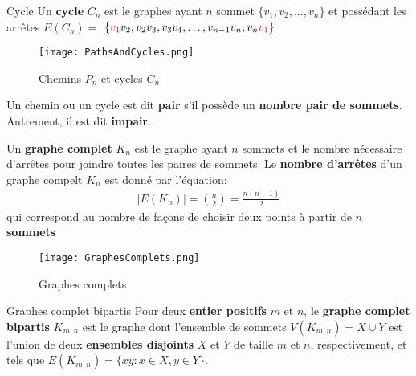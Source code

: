 \documentclass[16pt]{report}
\begin{document}
\begin{multicols*}{2}
            \begin{Definitionx}{Cycle}{}
                Un \textbf{cycle} $C_n$ est le graphes ayant $n$ sommet $\{v_1, v_2, \dots, v_n\}$ et possédant 
                les arrêtes $E(C_n) = $
                $\{\textcolor{red}{v_1}v_2, v_2v_3, v_3v_4, \dots, v_{n-1}v_n, v_n \textcolor{red}{v_1}\}$
            \end{Definitionx}
            
            \begin{figure}[H]
                \begin{center}
                    \texttt{[image: PathsAndCycles.png]}
                \end{center}
                \caption{Chemins $P_n$ et cycles $C_n$}
            \end{figure}
            Un chemin ou un cycle est dit \textbf{pair} s'il possède un \textbf{nombre pair de sommets}. 
            Autrement, il est dit \textbf{impair}. 
            \begin{Definitionx}{}{}
                Un \textbf{graphe complet} $K_n$ est le graphe ayant $n$ sommets et le nombre nécessaire 
                d'arrêtes pour joindre toutes les paires de sommets. Le \textbf{nombre d'arrêtes} 
                d'un graphe compelt $K_n$ est donné par l'équation: 
                \begin{align*}
                        |E(K_n)| = {n \choose 2} = \frac{n(n-1)}{2}
                \end{align*}
                qui correspond au nombre de façons de choisir deux points à partir de $n$ \textbf{sommets}  
            \end{Definitionx}
            \begin{figure}[H]
                \begin{center}
                    \texttt{[image: GraphesComplets.png]}
                \end{center}
                \caption{Graphes complets}
            \end{figure}


            \begin{Definitionx}{Graphes complet bipartis}{}
                Pour deux \textbf{entier positifs} $m$ et $n$, le \textbf{graphe complet bipartis} $K_{m,n}$ 
                est le graphe dont l'ensemble de sommets $V(K_{m,n}) = X \cup Y$ est l'union de 
                deux \textbf{ensembles disjoints} $X$ et $Y$ de taille $m$ et $n$, respectivement,  
                et tels que $E(K_{m,n}) = \{xy:x \in X, y \in Y\}$. 
            \end{Definitionx}


\end{multicols*}
\end{document}

